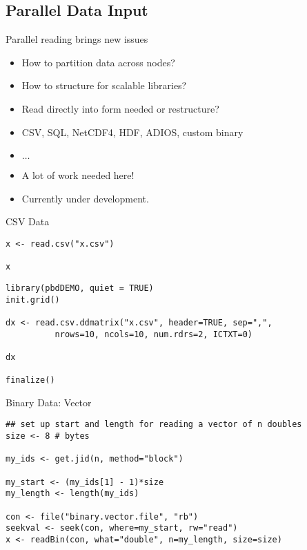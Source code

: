 \subsection{Parallel Data Input}
\makesubcontentsslidessec


\begin{frame}
  \begin{block}{Parallel reading brings new issues}\pause
    \begin{itemize}
    \item How to partition data across nodes?
    \item How to structure for scalable libraries?
    \item Read directly into form needed or restructure?
    \item CSV, SQL, NetCDF4, HDF, ADIOS, custom binary
    \item $\ldots$
    \item A lot of work needed here!
    \item Currently under development.
    \end{itemize}
  \end{block}
\end{frame}



\begin{frame}[fragile]
  \begin{exampleblock}{CSV Data}\pause
\begin{lstlisting}[title=Serial Code]
x <- read.csv("x.csv")

x
\end{lstlisting}

\begin{lstlisting}[title=Parallel Code]
library(pbdDEMO, quiet = TRUE)
init.grid()

dx <- read.csv.ddmatrix("x.csv", header=TRUE, sep=",", 
          nrows=10, ncols=10, num.rdrs=2, ICTXT=0)

dx

finalize()
\end{lstlisting}
  \end{exampleblock}
\end{frame}

\begin{frame}[fragile]
  \begin{exampleblock}{Binary Data: Vector}\pause
    \begin{lstlisting}
## set up start and length for reading a vector of n doubles
size <- 8 # bytes

my_ids <- get.jid(n, method="block")

my_start <- (my_ids[1] - 1)*size
my_length <- length(my_ids)

con <- file("binary.vector.file", "rb")
seekval <- seek(con, where=my_start, rw="read")
x <- readBin(con, what="double", n=my_length, size=size)
    \end{lstlisting}
  \end{exampleblock}
\end{frame}

